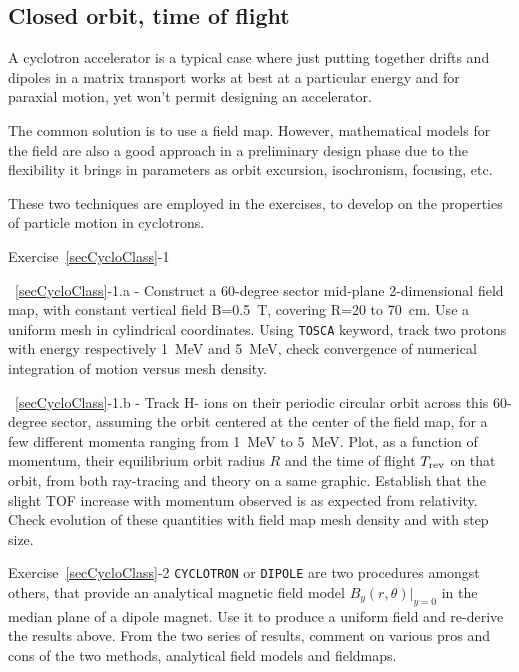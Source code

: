 \subsection{Closed orbit, time of flight \label{secCycloClassTra}}

A cyclotron accelerator is a typical case 
where just putting together drifts and dipoles in a matrix transport works at best 
at a particular energy and for paraxial motion, yet won't permit designing an accelerator. 

The common solution is to use a field map. However, mathematical models for the field 
are also a good approach in a preliminary design phase due to the flexibility it brings 
in parameters as orbit excursion, isochronism, focusing, etc.

These two techniques are employed  in the exercises, to develop on the properties of particle motion 
in cyclotrons. 

\smallskip
\noindent {\small $\bullet$} Exercise~\ref{secCycloClass}-1 

\noindent ~\ref{secCycloClass}-1.a - 
Construct a 60-degree sector mid-plane 2-dimensional field map, with constant vertical field 
B=0.5~T, covering R=20 to 70~cm. Use a uniform mesh in cylindrical coordinates. 
Using \texttt{TOSCA} keyword, track two protons with energy respectively 1~MeV and 5~MeV, 
check convergence of numerical integration of motion versus mesh density. 

\noindent ~\ref{secCycloClass}-1.b - 
Track H- ions on their periodic circular orbit across this 60-degree sector, 
assuming the orbit centered at the center of the field map, 
for a few different momenta ranging from 1~MeV to 5~MeV.
 Plot, as a function of momentum, their 
equilibrium orbit radius $R$ and the time of flight $T_{\rm rev}$ on that orbit, 
 from both ray-tracing and  theory on a same graphic. 
Establish that the slight TOF increase with momentum observed is as expected from relativity. 
Check evolution of these quantities with field map mesh density and with step size.



\smallskip
\noindent {\small $\bullet$} Exercise~\ref{secCycloClass}-2 
 \verb|CYCLOTRON| or \verb|DIPOLE| are two procedures amongst others, that provide an analytical 
 magnetic field model ${B_y(r,\theta)|_{y=0}}$ in the median plane of a dipole magnet. 
Use it to produce a uniform field and re-derive the results above. 
From the two series of results, comment on various pros and cons of the two methods, analytical field models and 
fieldmaps.


